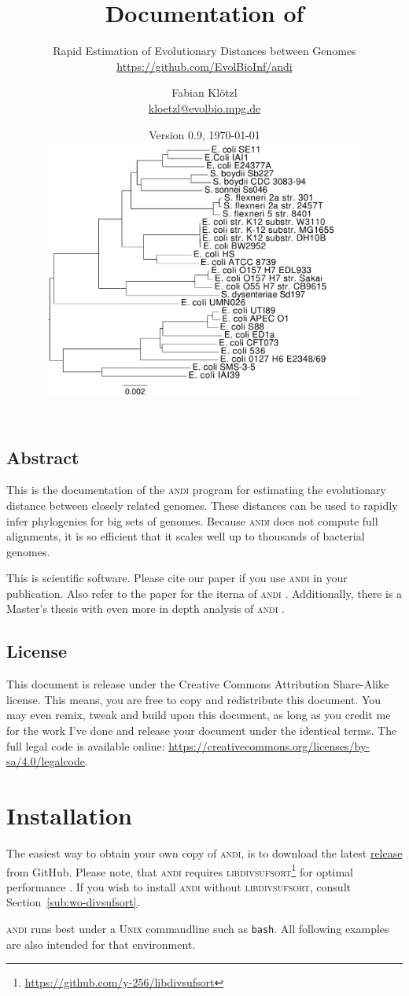 \documentclass[a4paper,
  10pt,
  english,
  DIV=12,
  BCOR=8mm]{scrbook}
\title{Documentation of \algo{andi}}
\subtitle{Rapid Estimation of Evolutionary Distances between Genomes\\ {\small\url{https://github.com/EvolBioInf/andi}}}
\author{Fabian Klötzl\\ \href{mailto:kloetzl@evolbio.mpg.de}{kloetzl@evolbio.mpg.de}}
\date{Version 0.9, \isodate\today \\
\vspace*{2cm}
\centering\includegraphics[width=0.8\textwidth]{andi_labels.pdf}}
\newcommand{\algo}[1]{\textsc{{#1}}}
\newcommand{\andi}{\algo{andi} }
\begin{document}
\maketitle

\section*{Abstract}
This is the documentation of the \andi program for estimating the evolutionary distance between closely related genomes. These distances can be used to rapidly infer phylogenies for big sets of genomes. Because \andi does not compute full alignments, it is so efficient that it scales well up to thousands of bacterial genomes.

This is scientific software. Please cite our paper \cite{andi} if you use \andi in your publication. Also refer to the paper for the iterna of \andi. Additionally, there is a Master's thesis with even more in depth analysis of \andi \cite{kloetzl}.

\vspace*{1cm}
\section*{License}
This document is release under the Creative Commons Attribution Share-Alike license. This means, you are free to copy and redistribute this document. You may even remix, tweak and build upon this document, as long as you credit me for the work I've done and release your document under the identical terms. The full legal code is available online: {\small\url{https://creativecommons.org/licenses/by-sa/4.0/legalcode}}.

\tableofcontents

\chapter{Installation} %

The easiest way to obtain your own copy of \algo{andi}, is to download the latest \href{https://github.com/EvolBioInf/andi/releases}{release} from GitHub. Please note, that \andi requires \algo{libdivsufsort}\footnote{\url{https://github.com/y-256/libdivsufsort}} for optimal performance \cite{divsufsort}. If you wish to install \andi without \algo{libdivsufsort}, consult Section~\ref{sub:wo-divsufsort}.

\andi runs best under a \algo{Unix} commandline such as \lstinline$bash$. All following examples are also intended for that environment.
\end{document}
